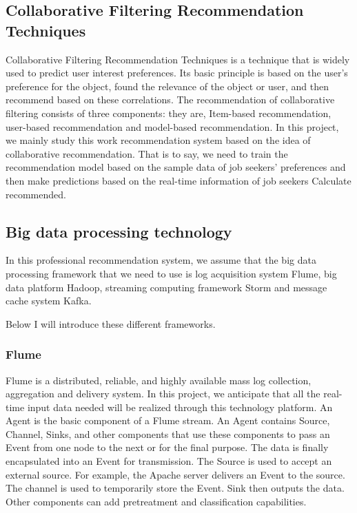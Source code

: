\documentclass[sigconf]{acmart}
\begin{document}
\subsection{Collaborative Filtering Recommendation Techniques}
Collaborative Filtering Recommendation Techniques is a technique that is widely used to predict user interest preferences. Its basic principle is based on the user's preference for the object, found the relevance of the object or user, and then recommend based on these correlations. The recommendation of collaborative filtering consists of three components: they are, Item-based recommendation, user-based recommendation and model-based recommendation. In this project, we mainly study this work recommendation system based on the idea of collaborative recommendation. That is to say, we need to train the recommendation model based on the sample data of job seekers' preferences and then make predictions based on the real-time information of job seekers Calculate recommended.

\subsection{Big data processing technology}
In this professional recommendation system, we assume that the big data processing framework that we need to use is log acquisition system Flume, big data platform Hadoop, streaming computing framework Storm and message cache system Kafka.

\par Below I will introduce these different frameworks.


\subsubsection{Flume}
Flume is a distributed, reliable, and highly available mass log collection, aggregation and delivery system. In this project, we anticipate that all the real-time input data needed will be realized through this technology platform. An Agent is the basic component of a Flume stream. An Agent contains Source, Channel, Sinks, and other components that use these components to pass an Event from one node to the next or for the final purpose. The data is finally encapsulated into an Event for transmission. The Source is used to accept an external source. For example, the Apache server delivers an Event to the source. The channel is used to temporarily store the Event. Sink then outputs the data. Other components can add pretreatment and classification capabilities.
\end{document}
